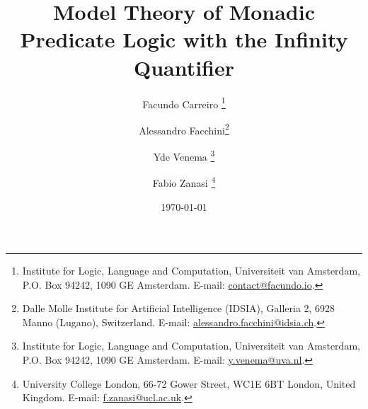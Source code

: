 \documentclass[10pt]{article}
\title{Model Theory of Monadic Predicate Logic with the Infinity Quantifier%
}
\author{
Facundo Carreiro
\thanks{Institute for Logic, Language and Computation, Universiteit van Amsterdam,
   P.O. Box 94242, 1090 GE Amsterdam. E-mail: \url{contact@facundo.io}.}
\and Alessandro Facchini\thanks{Dalle Molle Institute for Artificial Intelligence (IDSIA),
Galleria 2, 6928 Manno (Lugano), Switzerland. E-mail: \url{alessandro.facchini@idsia.ch}.}
\and Yde Venema
\thanks{Institute for Logic, Language and Computation, Universiteit van Amsterdam,
   P.O. Box 94242, 1090 GE Amsterdam. E-mail: \url{y.venema@uva.nl}.}
\and Fabio Zanasi
\thanks{University College London,
66-72 Gower Street, WC1E 6BT London, United Kingdom. E-mail: \url{f.zanasi@ucl.ac.uk}.}
}
\date{\today}
\begin{document}
\maketitle





















{\small


}
\end{document}

